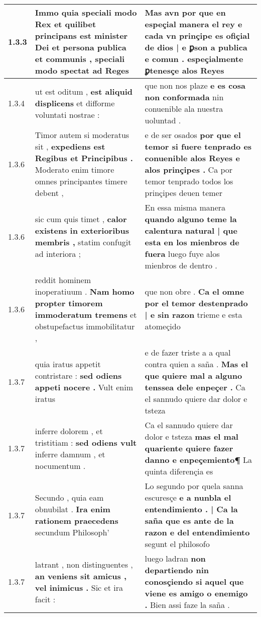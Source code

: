 \begin{tabular}{|p{1cm}|p{6.5cm}|p{6.5cm}|}
1.3.3 & Immo quia speciali modo Rex \textbf{ et quilibet principans est minister Dei et persona publica et communis , } speciali modo spectat ad Reges & Mas avn por que en espeçial manera el rey \textbf{ e cada vn prinçipe es ofiçial de dios | e ꝑson a publica e comun . } espeçialmente ꝑtenesçe alos Reyes \\\hline
1.3.4 & ut est oditum , \textbf{ est aliquid displicens } et difforme voluntati nostrae : & que non nos plaze \textbf{ e es cosa non conformada } nin conuenible ala nuestra uoluntad . \\\hline
1.3.6 & Timor autem si moderatus sit , \textbf{ expediens est Regibus et Principibus . } Moderato enim timore omnes principantes timere debent , & e de ser osados \textbf{ por que el temor si fuere tenprado es conuenible alos Reyes e alos prinçipes . } Ca por temor tenprado todos los prinçipes deuen temer \\\hline
1.3.6 & sic cum quis timet , \textbf{ calor existens in exterioribus membris , } statim confugit ad interiora ; & En essa misma manera \textbf{ quando alguno teme la calentura natural | que esta en los mienbros de fuera } luego fuye alos mienbros de dentro . \\\hline
1.3.6 & reddit hominem inoperatiuum . \textbf{ Nam homo propter timorem immoderatum tremens } et obstupefactus immobilitatur , & que non obre . \textbf{ Ca el omne por el temor destenprado | e sin razon } trieme e esta atomeçido \\\hline
1.3.7 & quia iratus appetit contristare : \textbf{ sed odiens appeti nocere . } Vult enim iratus & e de fazer triste a a qual contra quien a saña . \textbf{ Mas el que quiere mal a alguno tenssea dele enpeçer . } Ca el sannudo quiere dar dolor e tsteza \\\hline
1.3.7 & inferre dolorem , et tristitiam : \textbf{ sed odiens vult } inferre damnum , et nocumentum . & Ca el sannudo quiere dar dolor e tsteza \textbf{ mas el mal quariente quiere fazer danno e enpeçemiento¶ } La quinta diferençia es \\\hline
1.3.7 & Secundo , quia eam obnubilat . \textbf{ Ira enim rationem praecedens } secundum Philosoph’ & Lo segundo por quela sanna escuresçe \textbf{ e a nunbla el entendimiento . | Ca la saña que es ante de la razon e del entendimiento } segunt el philosofo \\\hline
1.3.7 & latrant , non distinguentes , \textbf{ an veniens sit amicus , vel inimicus . } Sic et ira facit : & luego ladran \textbf{ non departiendo nin conosçiendo si aquel que viene es amigo o enemigo . } Bien assi faze la saña . \\\hline

\end{tabular}
